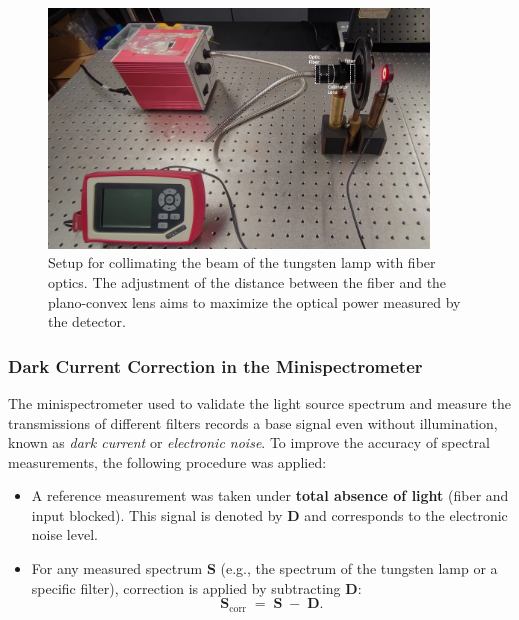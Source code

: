 \begin{figure}[h!]
    \centering
    \includegraphics[trim=30mm 0mm 40mm 25mm, clip, width=0.9\textwidth]{Figures/C3/colimacion.pdf}
    \caption{Setup for collimating the beam of the tungsten lamp with fiber optics. The adjustment of the distance between the fiber and the plano-convex lens aims to maximize the optical power measured by the detector.}
    \label{fig:montaje_colimacion}
\end{figure}

\subsubsection{Dark Current Correction in the Minispectrometer}
\label{subsub:corriente_oscura_espectrometro}

The minispectrometer used to validate the light source spectrum and measure the transmissions of different filters records a base signal even without illumination, known as \emph{dark current} or \emph{electronic noise}. To improve the accuracy of spectral measurements, the following procedure was applied:

\begin{itemize}
    \item A reference measurement was taken under \textbf{total absence of light} (fiber and input blocked). This signal is denoted by \(\mathbf{D}\) and corresponds to the electronic noise level.
    
    \item For any measured spectrum \(\mathbf{S}\) (e.g., the spectrum of the tungsten lamp or a specific filter), correction is applied by subtracting \(\mathbf{D}\):
    \[
        \mathbf{S}_{\text{corr}} \;=\; \mathbf{S} \;-\; \mathbf{D}.
    \]
\end{itemize}

